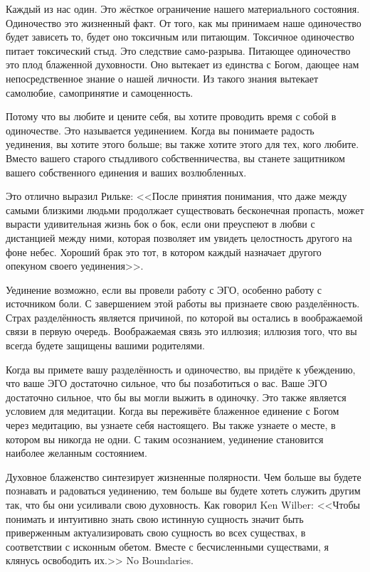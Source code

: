 \documentclass[10pt, fleqn]{article}
\begin{document}

Каждый из нас один. Это жёсткое ограничение нашего материального состояния. Одиночество это жизненный факт. От того, как мы принимаем наше одиночество будет зависеть то, будет оно токсичным или питающим. Токсичное одиночество питает токсический стыд. Это следствие само-разрыва. Питающее одиночество это плод блаженной духовности. Оно вытекает из единства с Богом, дающее нам непосредственное знание о нашей личности. Из такого знания вытекает самолюбие, самопринятие и самоценность.

Потому что вы любите и цените себя, вы хотите проводить время с собой в одиночестве. Это называется уединением. Когда вы понимаете радость уединения, вы хотите этого больше; вы также хотите этого для тех, кого любите. Вместо вашего старого стыдливого собственничества, вы станете защитником вашего собственного единения и ваших возлюбленных.

Это отлично выразил Рильке: <<После принятия понимания, что даже между самыми близкими людьми продолжает существовать бесконечная пропасть, может вырасти удивительная жизнь бок о бок, если они преуспеют в любви с дистанцией между ними, которая позволяет им увидеть целостность другого на фоне небес. Хороший брак это тот, в котором каждый назначает другого опекуном своего уединения>>.

Уединение возможно, если вы провели работу с ЭГО, особенно работу с источником боли. С завершением этой работы вы признаете свою разделённость. Страх разделённость является причиной, по которой вы остались в воображаемой связи в первую очередь. Воображаемая связь это иллюзия; иллюзия того, что вы всегда будете защищены вашими родителями.

Когда вы примете вашу разделённость и одиночество, вы придёте к убеждению, что ваше ЭГО достаточно сильное, что бы позаботиться о вас. Ваше ЭГО достаточно сильное, что бы вы могли выжить в одиночку. Это также является условием для медитации. Когда вы переживёте блаженное единение с Богом через медитацию, вы узнаете себя настоящего. Вы также узнаете о месте, в котором вы никогда не одни. С таким осознанием, уединение становится наиболее желанным состоянием.


Духовное блаженство синтезирует жизненные полярности. Чем больше вы будете познавать и радоваться уединению, тем больше вы будете хотеть служить другим так, что бы они усиливали свою духовность. Как говорил Ken Wilber: <<Чтобы понимать и интуитивно знать свою истинную сущность значит быть приверженным актуализировать свою сущность во всех существах, в соответствии с исконным обетом. Вместе с бесчисленными существами, я клянусь освободить их.>> No Boundaries.
\end{document}
